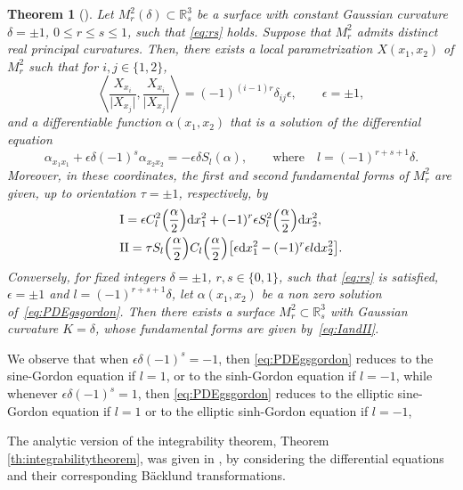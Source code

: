 \documentclass[pdftex]{sigma}
\numberwithin{equation}{section}
\newtheorem{Theorem}{Theorem}[section]
\begin{document}
\begin{Theorem}[\cite{KRT2022}] \label{PDE}
Let $M_r^2(\delta)\subset{\mathbb{R}}^3_s$ be a surface with constant Gaussian curvature ${\delta=\pm 1}$, $0\leq r\leq s\leq 1$, such that \eqref{eq:rs} holds. Suppose that $M^2_r$ admits distinct real principal curvatures.
Then, there exists a local parametrization $X(x_1,x_2)$ of $M^2_r$ such that
for $ i,j \in\{1,2\} $,
\[
\left\langle
\frac {X_{x_i}} {\vert X_{x_j}\vert},\frac{X_{x_i}}{\vert X_{x_j}\vert} \right\rangle = (-1)^{(i-1)r} \delta_{ij} \epsilon , \qquad \epsilon=\pm 1,
\]
and a differentiable function $\alpha(x_1,x_2)$ that is a solution of the differential equation
\begin{equation}
\label{eq:PDEgsgordon}
\alpha_{x_1x_1}+\epsilon\delta(-1)^{s} \alpha_{x_2x_2} =-\epsilon\delta S_l(\alpha),\qquad\mbox{where}\quad l=(-1)^{r+s+1}\delta .
\end{equation}
Moreover, in these coordinates, the first and second fundamental forms of $M^2_r$ are given, up to orientation $\tau=\pm 1$, respectively, by
\begin{align}
&{\rm I}=\epsilon C_l^2\Bigl(\frac{\alpha}{2}\Bigr){\rm d}x_1^2+(-1)^r \epsilon S_l^2\Bigl(\frac{\alpha}{2}\Bigr){\rm d}x^2_2,\nonumber\\
&{\rm II}=\tau S_l\Bigl(\frac{\alpha}{2}\Bigr)C_l\Bigl(\frac{\alpha}{2}\Bigr) \bigl[ \epsilon {\rm d}x_1^2-(-1)^r\epsilon l{\rm d}x^2_2\bigr].\label{eq:IandII}
\end{align}
Conversely, for fixed integers $\delta=\pm 1$, $ r, s\in\{0,1\}$, such that \eqref{eq:rs} is satisfied,
 $\epsilon=\pm 1$ and $l=(-1)^{r+s+1}\delta $, let $\alpha(x_1,x_2)$
 be a non zero solution of~\eqref{eq:PDEgsgordon}. Then there exists a surface $M^2_r\subset {\mathbb{R}}^3_s$ with Gaussian curvature $K=\delta$, whose fundamental forms are given by~\eqref{eq:IandII}.
\end{Theorem}

We observe that when $\epsilon\delta(-1)^{s}=-1$, then \eqref{eq:PDEgsgordon} reduces to the sine-Gordon equation if $l=1$, or to the sinh-Gordon equation if $l=-1$, while whenever $\epsilon\delta(-1)^{s}=1$, then \eqref{eq:PDEgsgordon} reduces to the elliptic sine-Gordon equation if $l=1$ or to the elliptic sinh-Gordon equation if $l=-1$,

The analytic version of the integrability theorem, Theorem \ref{th:integrabilitytheorem}, was given in \cite{KRT2022}, by considering the differential equations and their corresponding B\"acklund transformations. %
\end{document}
